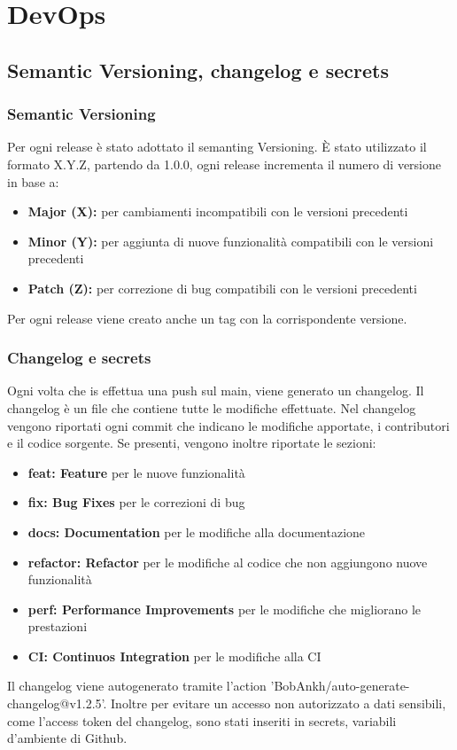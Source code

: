 
\chapter{DevOps}
\label{ch:DevOps} %
\section{Semantic Versioning, changelog e secrets}
\subsection{Semantic Versioning}
Per ogni release è stato adottato il semanting Versioning. È stato utilizzato il formato X.Y.Z, partendo da 1.0.0, ogni release incrementa il numero di versione in base a:
\begin{itemize}
    \item \textbf{Major (X):} per cambiamenti incompatibili con le versioni precedenti
    \item \textbf{Minor (Y):} per aggiunta di nuove funzionalità compatibili con le versioni precedenti
    \item \textbf{Patch (Z):} per correzione di bug compatibili con le versioni precedenti
\end{itemize}
Per ogni release viene creato anche un tag con la corrispondente versione.
\subsection{Changelog e secrets}
Ogni volta che is effettua una push sul main, viene generato un changelog. Il changelog è un file che contiene tutte le modifiche effettuate.
Nel changelog vengono riportati ogni commit che indicano le modifiche apportate, i contributori e il codice sorgente.
Se presenti, vengono inoltre riportate le sezioni: 
\begin{itemize}
    \item \textbf{feat: Feature} per le nuove funzionalità
    \item \textbf{fix: Bug Fixes} per le correzioni di bug
    \item \textbf{docs: Documentation} per le modifiche alla documentazione
    \item \textbf{refactor: Refactor} per le modifiche al codice che non aggiungono nuove funzionalità
    \item \textbf{perf: Performance Improvements} per le modifiche che migliorano le prestazioni
    \item \textbf{CI: Continuos Integration} per le modifiche alla CI
\end{itemize}
Il changelog viene autogenerato tramite l'action 'BobAnkh/auto-generate-changelog@v1.2.5'.
Inoltre per evitare un accesso non autorizzato a dati sensibili, come l'access token del changelog, sono stati inseriti in secrets, variabili d'ambiente di Github. 
